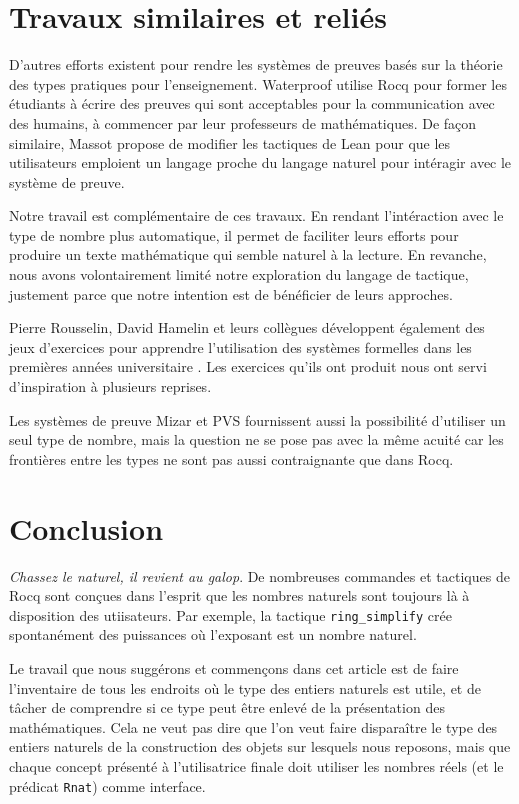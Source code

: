 \documentclass[draft]{jflart}
\begin{document}
\section{Travaux similaires et reliés}
D'autres efforts existent pour rendre les systèmes de preuves basés
sur la théorie des types pratiques pour l'enseignement.  Waterproof
\cite{Wemmenhove_2024}
utilise Rocq pour former les étudiants à écrire des preuves qui sont
acceptables pour la communication avec des humains, à commencer par
leur professeurs de mathématiques.  De façon similaire, Massot
\cite{massot:LIPIcs.ITP.2024.27}
propose
de modifier les tactiques de Lean pour que les utilisateurs emploient
un langage proche du langage naturel pour intéragir avec le système de
preuve.

Notre travail est complémentaire de ces travaux.  En rendant
l'intéraction avec le type de nombre plus automatique, il permet de
faciliter leurs efforts pour produire un texte mathématique qui semble
naturel à la lecture.  En revanche, nous avons volontairement limité
notre exploration du langage de tactique, justement parce que notre
intention est de bénéficier de leurs approches.

Pierre Rousselin, David Hamelin et leurs collègues développent
également des jeux d'exercices pour apprendre l'utilisation des
systèmes formelles dans les premières années universitaire
\cite{RousselinPF24}.  Les
exercices qu'ils ont produit nous ont servi d'inspiration à plusieurs
reprises.

Les systèmes de preuve Mizar \cite{Mizar-beyond2015} et PVS
\cite{PVS11} fournissent aussi
la possibilité d'utiliser un seul type de nombre, mais la question ne
se pose pas avec la même acuité car les frontières entre les types ne
sont pas aussi contraignante que dans Rocq.

\section{Conclusion}
{\em Chassez le naturel, il revient au galop}.  De nombreuses commandes
et tactiques de Rocq sont conçues dans l'esprit que les nombres naturels
sont toujours là à disposition des utiisateurs.  Par exemple, la tactique
\texttt{ring\_simplify} crée spontanément des puissances où l'exposant est un
nombre naturel.

Le travail que nous suggérons et commençons dans cet article est de
faire l'inventaire de tous les endroits où le type des entiers
naturels est utile, et de tâcher de comprendre si ce type peut être
enlevé de la présentation des mathématiques.  Cela ne veut pas dire
que l'on veut faire disparaître le type des entiers naturels de la
construction des objets sur lesquels nous reposons, mais que chaque
concept présenté à l'utilisatrice finale doit utiliser les nombres
réels (et le prédicat \texttt{Rnat}) comme interface.
\end{document}

